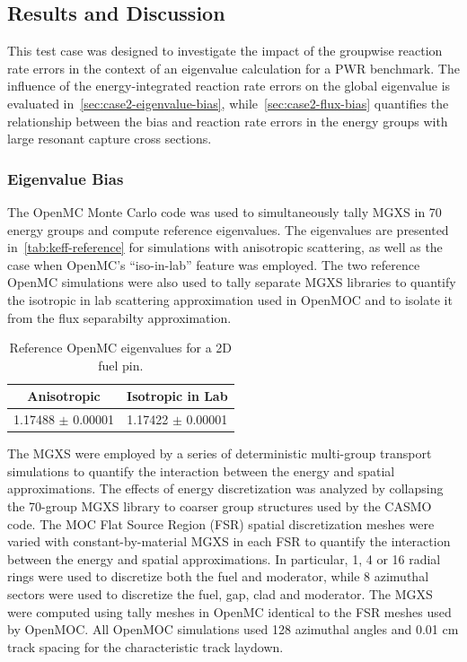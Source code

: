 \subsection{Results and Discussion}

This test case was designed to investigate the impact of the groupwise reaction rate errors in the context of an eigenvalue calculation for a PWR benchmark. The influence of the energy-integrated reaction rate errors on the global eigenvalue is evaluated in~\autoref{sec:case2-eigenvalue-bias}, while~\autoref{sec:case2-flux-bias} quantifies the relationship between the bias and reaction rate errors in the energy groups with large resonant capture cross sections.



\subsubsection{Eigenvalue Bias}
\label{sec:case2-eigenvalue-bias}

The OpenMC Monte Carlo code was used to simultaneously tally MGXS in 70 energy groups and compute reference eigenvalues. The eigenvalues are presented in~\autoref{tab:keff-reference} for simulations with anisotropic scattering, as well as the case when OpenMC's ``iso-in-lab'' feature was employed. The two reference OpenMC simulations were also used to tally separate MGXS libraries to quantify the isotropic in lab scattering approximation used in OpenMOC and to isolate it from the flux separabilty approximation.

\begin{table}[h!]
  \centering
  \caption{Reference OpenMC eigenvalues for a 2D fuel pin.}
  \label{tab:keff-reference} 
  \begin{tabular}{c c}
  \toprule
  {\bf Anisotropic} &
  {\bf Isotropic in Lab} \\
  \midrule
  1.17488 $\pm$ 0.00001 & 1.17422 $\pm$ 0.00001 \\
  \bottomrule
\end{tabular}
\end{table}

The MGXS were employed by a series of deterministic multi-group transport simulations to quantify the interaction between the energy and spatial approximations. The effects of energy discretization was analyzed by collapsing the 70-group MGXS library to coarser group structures used by the CASMO code. The MOC Flat Source Region (FSR) spatial discretization meshes were varied with constant-by-material MGXS in each FSR to quantify the interaction between the energy and spatial approximations. In particular, 1, 4 or 16 radial rings were used to discretize both the fuel and moderator, while 8 azimuthal sectors were used to discretize the fuel, gap, clad and moderator. The MGXS were computed using tally meshes in OpenMC identical to the FSR meshes used by OpenMOC. All OpenMOC simulations used 128 azimuthal angles and 0.01 cm track spacing for the characteristic track laydown.

